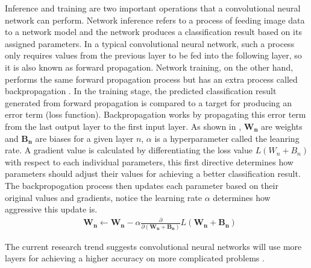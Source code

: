 \documentclass[a4paper,12pt]{report}
\begin{document}
Inference and training are two important operations that a
convolutional neural network can perform.
Network inference refers to a process of feeding image data to a network model and
the network produces a classification result based on its assigned parameters.
In a typical convolutional neural network, such a process only requires values from the
previous layer to be fed into the following layer, so it is also known as forward propagation.
Network training, on the other hand, performs the same forward propagation process but
has an extra process called backpropagation \cite{hecht1988theory}.
In the training stage, the predicted classification result generated from
forward propagation is compared to
a target for producing an error term (loss function).
Backpropagation works by propagating this error term from the last output layer
to the first input layer.
As shown in , $\mathbf{W_{n}}$ are weights and $\mathbf{B_n}$ are biases for
a given layer $n$, $\alpha$ is a hyperparameter called the leanring rate.
A gradient value is calculated by differentiating the loss value $L(W_n + B_n)$
with respect to each individual parameters, this first directive
determines how parameters should adjust their values for achieving a better classification
result.
The backpropogation process then updates each parameter based on their original
values and gradients, notice the learning rate $\alpha$ determines how aggressive
this update is.
\begin{equation}
  \begin{aligned}
    & \mathbf{W_{n}} \leftarrow \mathbf{W_{n}}- \alpha \frac{\partial}{\partial(\mathbf{W_{n}} + \mathbf{B_n})} L(\mathbf{W_n}+ \mathbf{B_n})
  \end{aligned}
  \label{equ:backprop}
\end{equation}

The current research trend suggests convolutional neural networks will use more layers
for achieving a higher accuracy on more complicated problems \cite{Lecun1998gradient,
Krizhevsky, Coates}.
\end{document}
